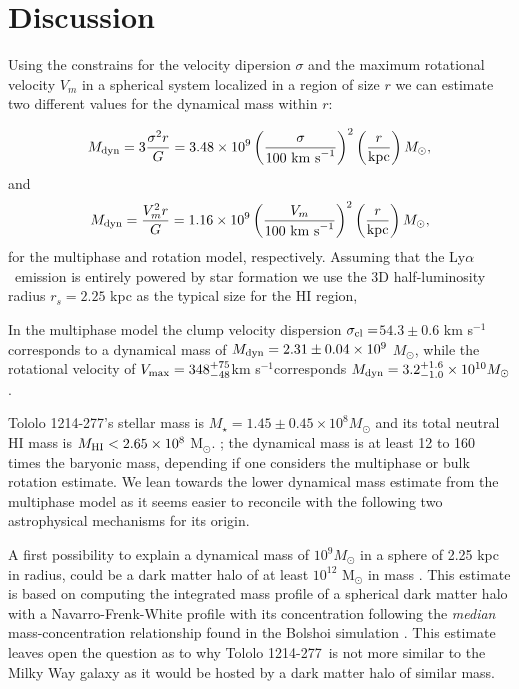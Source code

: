 \documentclass[a4,useAMS,usenatbib,usegraphicx]{mn2e}
\newcommand{\tol}{Tololo 1214-277}
\newcommand{\lya}{Ly$\alpha$}
\newcommand{\kms}{km s$^{-1}$}
\newcommand{\sigmaclump}{$54.3\pm 0.6$ km s$^{-1}$}
\begin{document}
\section{Discussion}

Using the constrains for the velocity dipersion $\sigma$ and the
maximum rotational velocity $V_m$ in a spherical system localized in a
region of size $r$ we can estimate two different values for the
dynamical mass within $r$: 


\begin{equation}
M_{\rm dyn} = 3 \frac{\sigma ^{2}r}{G} = 3.48\times10^{9}
\left(\frac{\sigma}{100\ \mathrm{km\ s}^{-1}}\right)^2\left(\frac{r}{\mathrm{kpc}}\right)
M_{\odot}, 
\end{equation}
%
and
%
\begin{equation}
M_{\rm dyn} = \frac{V_m ^{2}r}{G} = 1.16\times10^{9}
\left(\frac{V_m}{100\ \mathrm{km\ s}^{-1}}\right)^2\left(\frac{r}{\mathrm{kpc}}\right)M_{\odot}, 
\end{equation}
%
for the multiphase and rotation model, respectively.
Assuming that the \lya\ emission is entirely powered by star formation 
we use the 3D half-luminosity radius $r_s=2.25$ kpc as the typical size
for the HI region,


In the multiphase model the clump velocity dispersion
$\sigma_{\rm{cl}}=$\sigmaclump corresponds to a dynamical mass of
$M_{\rm dyn}=2.31\pm0.04 \times 10^{9}$ $M_{\odot}$, while the
rotational velocity of $V_{\rm max}=348^{+75}_{-48}$\kms corresponds
$M_{\rm dyn} = 3.2_{-1.0}^{+1.6}\times 10^{10} M_{\odot}$.


\tol's stellar mass is  $M_{\star} = 1.45\pm0.45\times 10^{8}
M_{\odot}$   \citep{2014PASP..126.1079M} and its total neutral HI mass is $M_{\rm HI}<2.65\times 10^{8}$ M$_{\odot}$. 
\citep{pustilnikmartin07}; the dynamical mass is at least 12 to 160 times
the baryonic mass, depending if one considers the multiphase or
bulk rotation estimate. 
We lean towards the lower dynamical mass estimate from the multiphase
model as it seems easier to reconcile with the following two
astrophysical mechanisms for its origin.

A first possibility to explain a dynamical mass of $10^{9} M_{\odot}$
in a sphere of 2.25 kpc in radius, could be a dark matter halo of at
least $10^{12}$ M$_{\odot}$ in mass \citep{2011ApJ...726..108T}.
This estimate is based on computing the integrated mass profile of a
spherical dark matter halo with a Navarro-Frenk-White profile with its
concentration following the \emph{median} mass-concentration
relationship found in the Bolshoi simulation
\citep{2012MNRAS.423.3018P}. 
This estimate leaves open the question as to why  \tol\ is not more
similar to the Milky Way galaxy as it would be hosted by a dark matter
halo of similar mass.
\end{document}
